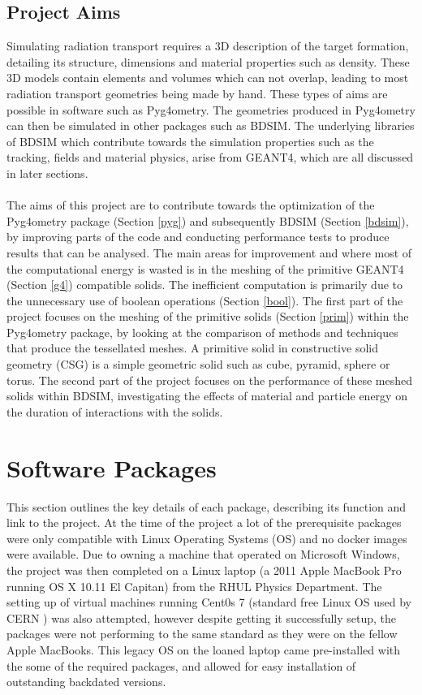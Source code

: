 \documentclass[12pt,a4paper]{article}
\begin{document}
\subsection{Project Aims}
\label{aim}
Simulating radiation transport requires a 3D description of the target formation, detailing its structure, dimensions and material properties such as density. These 3D models contain elements and volumes which can not overlap, leading to most radiation transport geometries being made by hand. These types of aims are possible in software such as Pyg4ometry. The geometries produced in Pyg4ometry can then be simulated in other packages such as BDSIM. The underlying libraries of BDSIM which contribute towards the simulation properties such as the tracking, fields and material physics, arise from GEANT4, which are all discussed in later sections.
\\\\
\noindent The aims of this project are to contribute towards the optimization of the Pyg4ometry package (Section \ref{pyg}) and subsequently BDSIM (Section \ref{bdsim}), by improving parts of the code and conducting performance tests to produce results that can be analysed. The main areas for improvement and where most of the computational energy is wasted is in the meshing of the primitive GEANT4 (Section \ref{g4}) compatible solids. The inefficient computation is primarily due to the unnecessary use of boolean operations (Section \ref{bool}). The first part of the project focuses on the meshing of the primitive solids (Section \ref{prim}) within the Pyg4ometry package, by looking at the comparison of methods and techniques that produce the tessellated meshes. A primitive solid in constructive solid geometry (CSG) is a simple geometric solid such as cube, pyramid, sphere or torus. The second part of the project focuses on the performance of these meshed solids within BDSIM, investigating the effects of material and particle energy on the duration of interactions with the solids.


\section{Software Packages}
\label{packs}
This section outlines the key details of each package, describing its function and link to the project. At the time of the project a lot of the prerequisite packages were only compatible with Linux Operating Systems (OS) and no docker images were available. Due to owning a machine that operated on Microsoft Windows, the project was then completed on a Linux laptop (a 2011 Apple MacBook Pro running OS X 10.11 El Capitan) from the RHUL Physics Department. The setting up of virtual machines running Cent0s 7 (standard free Linux OS used by CERN \cite{cern}) was also attempted, however despite getting it successfully setup, the packages were not performing to the same standard as they were on the fellow Apple MacBooks. This legacy OS on the loaned laptop came pre-installed with the some of the required packages, and allowed for easy installation of outstanding backdated versions. 
\end{document}
